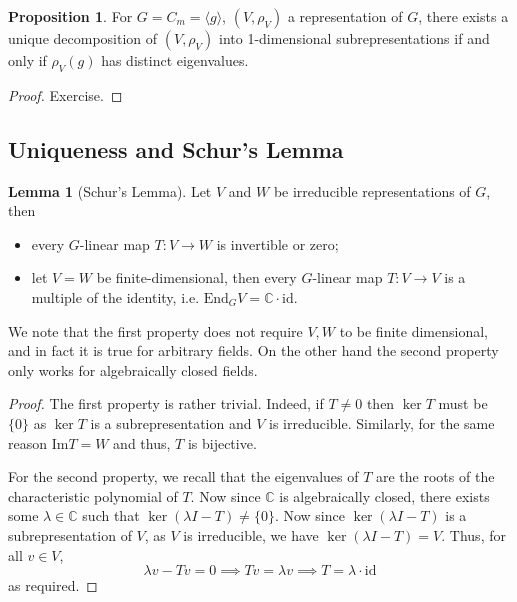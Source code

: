 \documentclass[]{article}
\theoremstyle{definition}
\theoremstyle{definition}
\newtheorem{lemma}{Lemma}[section]
\newtheorem{proposition}{Proposition}[section]
\begin{document}
\begin{proposition}
  For \(G = C_m = \langle g \rangle\), \((V, \rho_V)\) a representation of \(G\), 
  there exists a unique decomposition of \((V, \rho_V)\) into 1-dimensional 
  subrepresentations if and only if \(\rho_V(g)\) has distinct eigenvalues.
\end{proposition}
\begin{proof}
  Exercise.
\end{proof}

\subsection{Uniqueness and Schur's Lemma}

\begin{lemma}[Schur's Lemma]
  Let \(V\) and \(W\) be irreducible representations of \(G\), then 
  \begin{itemize}
    \item every \(G\)-linear map \(T : V \to W\) is invertible or zero;
    \item let \(V = W\) be finite-dimensional, then every \(G\)-linear map 
      \(T : V \to V\) is a multiple of the identity, i.e. 
      \(\text{End}_G V = \mathbb{C} \cdot \text{id}\).
  \end{itemize}
\end{lemma}

We note that the first property does not require \(V, W\) to be finite dimensional,
and in fact it is true for arbitrary fields. On the other hand the second property 
only works for algebraically closed fields. 

\begin{proof}
  The first property is rather trivial. Indeed, if \(T \neq 0\) then \(\ker T\) 
  must be \(\{0\}\) as \(\ker T\) is a subrepresentation and \(V\) is irreducible.
  Similarly, for the same reason \(\text{Im} T = W\) and thus, \(T\) is bijective. 

  For the second property, we recall that the eigenvalues of \(T\) are the roots 
  of the characteristic polynomial of \(T\). Now since \(\mathbb{C}\) is 
  algebraically closed, there exists some \(\lambda \in \mathbb{C}\) such that 
  \(\ker (\lambda I - T) \neq \{0\}\). Now since \(\ker (\lambda I - T)\) is 
  a subrepresentation of \(V\), as \(V\) is irreducible, we have 
  \(\ker (\lambda I - T) = V\). Thus, for all \(v \in V\), 
  \[\lambda v - T v = 0 \implies T v = \lambda v \implies T = \lambda \cdot \text{id}\]
  as required.
\end{proof}
\end{document}
